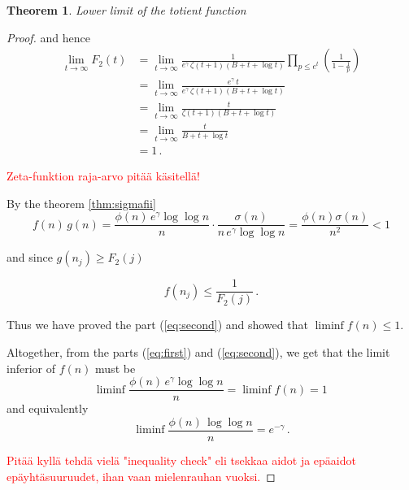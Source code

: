 \documentclass{article}
\theoremstyle{definition}
\newtheorem{theorem}[subsubsection]{Theorem}
\begin{document}
\begin{theorem}{\emph{Lower limit of the totient function}}
\begin{proof}
and hence
\begin{align*}
    \lim_{t \rightarrow \infty} F_2(t) & = \lim_{t \rightarrow \infty} \frac{1}{e^\gamma\,\zeta(t+1)(B+t+\log t)} \prod_{p\leq e^t} \left(\frac{1}{1-\frac{1}{p}}\right)\\
    & = \lim_{t \rightarrow \infty} \frac{e^\gamma\,t}{e^\gamma\,\zeta(t+1)(B+t+\log t)}\\
    & = \lim_{t \rightarrow \infty} \frac{t}{\zeta(t+1)(B+t+\log t)}\\
    & = \lim_{t \rightarrow \infty} \frac{t}{B+t+\log t}\\
    & = 1\,.
\end{align*}

\textcolor{red}{Zeta-funktion raja-arvo pitää käsitellä!}

By the theorem \ref{thm:sigmafii}
\begin{equation*}
    f(n)\,g(n) = \frac{\phi(n)\,e^\gamma \log\log n}{n} \cdot \frac{\sigma(n)}{n\,e^\gamma \log\log n} = \frac{\phi(n)\sigma(n)}{n^2}<1
\end{equation*}

and since $g(n_j) \geq F_2(j)$

\begin{equation*}
    f(n_j)\leq \frac{1}{F_2(j)}\,.
\end{equation*}

Thus we have proved the part (\ref{eq:second}) and showed that $\liminf{f(n)\leq 1}$.

Altogether, from the parts (\ref{eq:first}) and (\ref{eq:second}), we get that the limit inferior of $f(n)$ must be
\begin{equation*}
    \liminf{\frac{\phi(n)\,e^\gamma \log\log n}{n}}=\liminf{f(n)}=1\,
\end{equation*}
and equivalently
\begin{equation*}
    \liminf{\frac{\phi(n)\,\log\log n}{n}}=e^{-\gamma}\,.
\end{equation*}

\textcolor{red}{Pitää kyllä tehdä vielä "inequality check" eli tsekkaa aidot ja epäaidot epäyhtäsuuruudet, ihan vaan mielenrauhan vuoksi.}

\end{proof}

\end{theorem}
\end{document}

